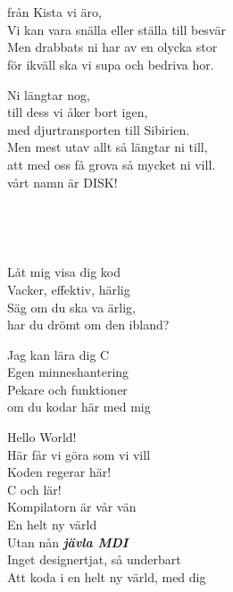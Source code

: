 



 \\       

 \\  
från Kista vi äro,\\  
Vi kan vara snälla eller ställa till besvär\\  
Men drabbats ni har av en olycka stor\\  
för ikväll ska vi supa och bedriva hor.  

Ni längtar nog,\\  
till dess vi åker bort igen,\\  
med djurtransporten till Sibirien.\\  
Men mest utav allt så längtar ni till,\\  
att med oss få grova så mycket ni vill.\\  
vårt namn är DISK!  

\\

\newpage 


 \\       
\author{Text: Arian och Sixten }

\songtext{}Låt mig visa dig kod\\
Vacker, effektiv, härlig\\
Säg om du ska va ärlig, \\
har du drömt om den ibland?

Jag kan lära dig C\\
Egen minneshantering\\
Pekare och funktioner \\ 
om du kodar här med mig

Hello World!\\
Här får vi göra som vi vill\\
Koden regerar här!\\
C och lär!\\
Kompilatorn är vår vän\\
En helt ny värld\\
Utan nån \textit{\textbf{jävla MDI}}\\
Inget designertjat, så underbart\\
Att koda i en helt ny värld, med dig

